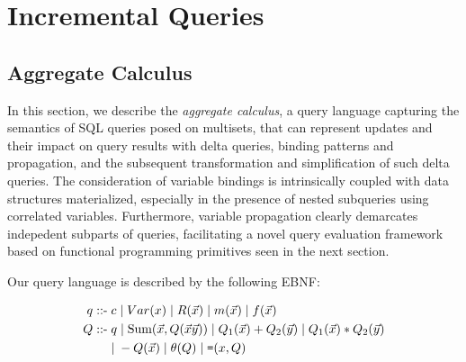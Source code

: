 \section{Incremental Queries}

\subsection{Aggregate Calculus}

\def\calcsum{\mbox{Sum}}
\def\calceq{\mbox{{\tt =}}}
\def\calcgt{\mbox{{\tt >}}}
\def\calcgte{\mbox{{\tt >=}}}
\def\calclte{\mbox{{\tt <=}}}

\def \q{q}
\def \qq{Q}
\def \qqa{Q_1}
\def \qqb{Q_2}
\def \v#1{\mbox{#1}}
\def \vv#1{\mbox{{\tiny #1}}}

\noindent{}

In this section, we describe the \textit{aggregate calculus}, a query language
capturing the semantics of SQL queries posed on multisets, that can represent
updates and their impact on query results with delta queries, binding patterns
and propagation, and the subsequent transformation and simplification of such
delta queries. The consideration of variable bindings is intrinsically coupled
with data structures materialized, especially in the presence of nested
subqueries using correlated variables. Furthermore, variable propagation
clearly demarcates indepedent subparts of queries, facilitating a novel query
evaluation framework based on functional programming primitives seen in the
next section.

\noindent Our query language is described by the following EBNF:

\begin{align*} 
\q \; \mbox{::-} &
  \;    c \;|\; Var(x)
  \;|\; R(\vec{x}) \;|\; m(\vec{x}) \;|\; f(\vec{x})
\\
\comment{
& \;|\; \theta(x,y)   \;|\; \theta_c(x)
  \;|\; \calceq(\q,y) \;|\; \calceq(x,y)
\\
}
\qq \; \mbox{::-} & \; \q \;|\; \calcsum(\vec{x}, \qq(\vec{x}\vec{y}))
    \;|\; \qqa(\vec{x}) + \qqb(\vec{y}) \;|\; \qqa(\vec{x}) * \qqb({\vec{y}}) \\
&   \;|\; -\qq(\vec{x}) \;|\; \theta(\qq) \;|\; \calceq(x,\qq)
\end{align*}

